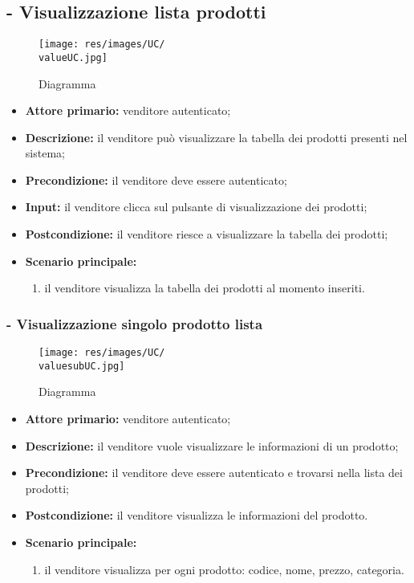 \stepUserCase
\subsection{- Visualizzazione lista prodotti}
\begin{figure}[H]
    \centering
    \texttt{[image: res/images/UC/\\valueUC.jpg]}
    \caption{Diagramma }
\end{figure}
\begin{itemize}
    \item \textbf{Attore primario:} venditore autenticato;
    \item \textbf{Descrizione:} il venditore può visualizzare la tabella dei prodotti presenti nel sistema;
    \item \textbf{Precondizione:} il venditore deve essere autenticato;
    \item \textbf{Input:} il venditore clicca sul pulsante di visualizzazione dei prodotti;
    \item \textbf{Postcondizione:} il venditore riesce a visualizzare la tabella dei prodotti;
    \item \textbf{Scenario principale:}
        \begin{enumerate}
            \item il venditore visualizza la tabella dei prodotti al momento inseriti.
        \end{enumerate}
\end{itemize}

\stepsubUserCase
\subsubsection{ - Visualizzazione singolo prodotto lista}
\begin{figure}[H]
    \centering
    \texttt{[image: res/images/UC/\\valuesubUC.jpg]}
    \caption{Diagramma }
\end{figure}
\begin{itemize}
    \item \textbf{Attore primario:} venditore autenticato;
    \item \textbf{Descrizione:} il venditore vuole visualizzare le informazioni di un prodotto;
    \item \textbf{Precondizione:} il venditore deve essere autenticato e trovarsi nella lista dei prodotti;
    \item \textbf{Postcondizione:} il venditore visualizza le informazioni del prodotto.
    \item \textbf{Scenario principale:}
        \begin{enumerate}
            \item il venditore visualizza per ogni prodotto: codice, nome, prezzo, categoria.
        \end{enumerate}
\end{itemize}

